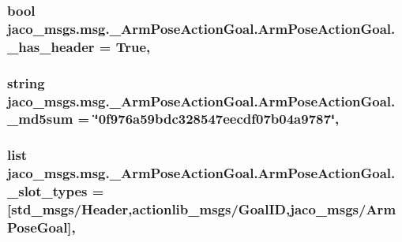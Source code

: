 \subsubsection[{\texorpdfstring{\+\_\+has\+\_\+header}{_has_header}}]{\setlength{\rightskip}{0pt plus 5cm}bool jaco\+\_\+msgs.\+msg.\+\_\+\+Arm\+Pose\+Action\+Goal.\+Arm\+Pose\+Action\+Goal.\+\_\+has\+\_\+header = True\hspace{0.3cm}{\ttfamily [static]}, {\ttfamily [private]}}\hypertarget{classjaco__msgs_1_1msg_1_1__ArmPoseActionGoal_1_1ArmPoseActionGoal_aa1acdab352d943375c07d0d5d530e340}{}\label{classjaco__msgs_1_1msg_1_1__ArmPoseActionGoal_1_1ArmPoseActionGoal_aa1acdab352d943375c07d0d5d530e340}
\subsubsection[{\texorpdfstring{\+\_\+md5sum}{_md5sum}}]{\setlength{\rightskip}{0pt plus 5cm}string jaco\+\_\+msgs.\+msg.\+\_\+\+Arm\+Pose\+Action\+Goal.\+Arm\+Pose\+Action\+Goal.\+\_\+md5sum = \char`\"{}0f976a59bdc328547eecdf07b04a9787\char`\"{}\hspace{0.3cm}{\ttfamily [static]}, {\ttfamily [private]}}\hypertarget{classjaco__msgs_1_1msg_1_1__ArmPoseActionGoal_1_1ArmPoseActionGoal_a46f459deb9954e12c33c89e71346cb27}{}\label{classjaco__msgs_1_1msg_1_1__ArmPoseActionGoal_1_1ArmPoseActionGoal_a46f459deb9954e12c33c89e71346cb27}
\subsubsection[{\texorpdfstring{\+\_\+slot\+\_\+types}{_slot_types}}]{\setlength{\rightskip}{0pt plus 5cm}list jaco\+\_\+msgs.\+msg.\+\_\+\+Arm\+Pose\+Action\+Goal.\+Arm\+Pose\+Action\+Goal.\+\_\+slot\+\_\+types = \mbox{[}\textquotesingle{}std\+\_\+msgs/Header\textquotesingle{},\textquotesingle{}actionlib\+\_\+msgs/Goal\+ID\textquotesingle{},\textquotesingle{}jaco\+\_\+msgs/{\bf Arm\+Pose\+Goal}\textquotesingle{}\mbox{]}\hspace{0.3cm}{\ttfamily [static]}, {\ttfamily [private]}}\hypertarget{classjaco__msgs_1_1msg_1_1__ArmPoseActionGoal_1_1ArmPoseActionGoal_aedf3895dc18914923f879e854518efb0}{}\label{classjaco__msgs_1_1msg_1_1__ArmPoseActionGoal_1_1ArmPoseActionGoal_aedf3895dc18914923f879e854518efb0}


